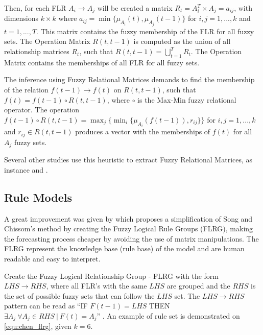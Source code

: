 Then, for each FLR $A_i\rightarrow A_j$  will be created a matrix $R_t = A_i^T \times A_j = a_{ij}$, with dimensions $k \times k$ where $a_{ij} = \min\{\mu_{A_i}(t),\mu_{A_j}(t-1)\}$ for $i,j = 1,...,k$ and $t = 1,...,T$. This matrix contains the fuzzy membership of the FLR for all fuzzy sets. The Operation Matrix $R(t,t-1)$ is computed as the union of all relationship matrices $R_t$, such that $ R(t,t-1) = \bigcup_{t=1}^T R_t$. The Operation Matrix contains the memberships of all FLR for all fuzzy sets.

The inference using Fuzzy Relational Matrices  demands to find the membership of the relation $f(t-1) \rightarrow f(t)$ on $R(t,t-1)$, such that $f(t) = f(t-1)\circ R(t,t-1)$, where $\circ$ is the Max-Min fuzzy relational operator. The operation $f(t-1)\circ R(t,t-1) = \max_j\{\min_i\{ \mu_{A_i}( f(t-1)), r_{ij}  \} \}$ for $i,j = 1,...,k$ and $r_{ij} \in R(t,t-1)$ produces a vector with the memberships of $f(t)$ for all $A_j$ fuzzy sets.

Several other studies use this heuristic to extract Fuzzy Relational Matrices, as instance \cite{Song1997, hwang1998handling, Song1999, Chen2000, Chen2006a,  Cheng2008a, Jilani2008a, Davari2009, Qiu2011,Cheng2012, Qiu2013} and \cite{Chuang2014}.

%
\subsection{Rule Models}
\label{sec:fts_rules}

A great improvement was given by \cite{chen1996forecasting} which proposes a  simplification of Song and Chissom's method by creating the Fuzzy Logical Rule Groups (FLRG), making the forecasting process cheaper by avoiding the use of matrix manipulations. The FLRG represent the knowledge base (rule base) of the model and are human readable and easy to interpret. 

Create the Fuzzy Logical Relationship Group - FLRG with the form $LHS \rightarrow RHS$, where all FLR's with the same $LHS$ are grouped and the $RHS$ is the set of possible fuzzy sets that can follow the $LHS$ set. The $LHS \rightarrow RHS$ pattern can be read as ``IF $F(t-1) = LHS$ THEN $\exists A_j\ \forall A_j \in RHS\ |\ F(t) = A_j$'' . An example of rule set is demonstrated on \ref{equ:chen_flrg}, given $k=6$. 

